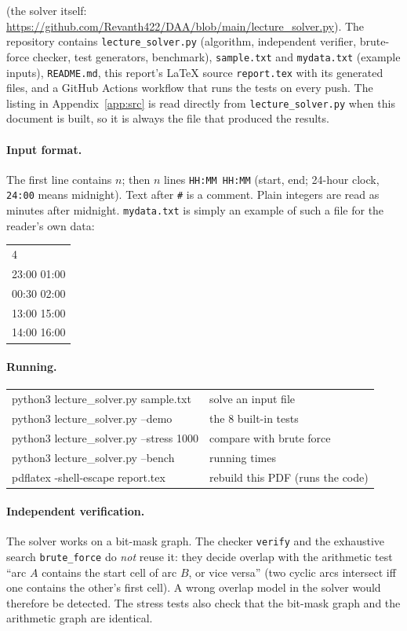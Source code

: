 \documentclass[11pt,a4paper]{article}
\theoremstyle{definition}
\theoremstyle{remark}
\begin{document}
\noindent (the solver itself: \url{https://github.com/Revanth422/DAA/blob/main/lecture_solver.py}).
The repository contains \texttt{lecture\_solver.py} (algorithm, independent verifier,
brute-force checker, test generators, benchmark), \texttt{sample.txt} and
\texttt{mydata.txt} (example inputs), \texttt{README.md}, this report's LaTeX source
\texttt{report.tex} with its generated files, and a GitHub Actions workflow that runs the
tests on every push.  The listing in Appendix~\ref{app:src} is read directly from
\texttt{lecture\_solver.py} when this document is built, so it is always the file that
produced the results.

\paragraph{Input format.} The first line contains $n$; then $n$ lines
\texttt{HH:MM HH:MM} (start, end; 24-hour clock, \texttt{24:00} means midnight).  Text after
\texttt{\#} is a comment.  Plain integers are read as minutes after midnight.
\texttt{mydata.txt} is simply an example of such a file for the reader's own data:
\begin{center}\ttfamily\small
\begin{tabular}{l}
4\\ 23:00 01:00\\ 00:30 02:00\\ 13:00 15:00\\ 14:00 16:00
\end{tabular}
\end{center}

\paragraph{Running.}
\begin{center}\ttfamily\small
\begin{tabular}{ll}
python3 lecture\_solver.py sample.txt & solve an input file\\
python3 lecture\_solver.py --demo & the 8 built-in tests\\
python3 lecture\_solver.py --stress 1000 & compare with brute force\\
python3 lecture\_solver.py --bench & running times\\
pdflatex -shell-escape report.tex & rebuild this PDF (runs the code)
\end{tabular}
\end{center}

\paragraph{Independent verification.} The solver works on a bit-mask graph.  The checker
\texttt{verify} and the exhaustive search \texttt{brute\_force} do \emph{not} reuse it:
they decide overlap with the arithmetic test ``arc $A$ contains the start cell of arc $B$,
or vice versa'' (two cyclic arcs intersect iff one contains the other's first cell).  A
wrong overlap model in the solver would therefore be detected.  The stress tests also check that the
bit-mask graph and the arithmetic graph are identical.
\end{document}
